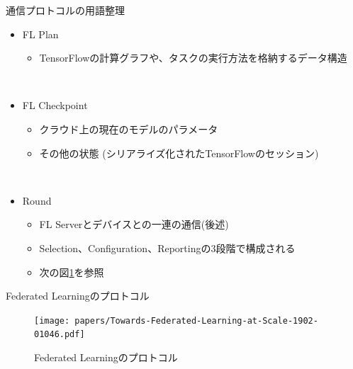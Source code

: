 \documentclass[dvipdfmx,notheorems,t]{beamer}
\begin{document}
\begin{frame}{通信プロトコルの用語整理}

\begin{itemize}
	\item \alert{FL Plan}
	\begin{itemize}
		\item TensorFlowの計算グラフや、タスクの実行方法を格納するデータ構造
	\end{itemize} \
	
	\item \alert{FL Checkpoint}
	\begin{itemize}
		\item クラウド上の現在のモデルのパラメータ
		\item その他の状態 (シリアライズ化されたTensorFlowのセッション)
	\end{itemize} \
	
	\item \alert{Round}
	\begin{itemize}
		\item FL Serverとデバイスとの一連の通信(後述)
		\item \alert{Selection}、\alert{Configuration}、\alert{Reporting}の3段階で構成される
		\item 次の図\ref{fig:fl-protocol}を参照
	\end{itemize}
\end{itemize}

\end{frame}

\begin{frame}{Federated Learningのプロトコル}

\begin{figure}
	\centering
	\texttt{[image: papers/Towards-Federated-Learning-at-Scale-1902-01046.pdf]}
	\caption{Federated Learningのプロトコル~\cite{DBLP:journals/corr/abs-1902-01046}}
	\label{fig:fl-protocol}
\end{figure}

\end{frame}
\end{document}
